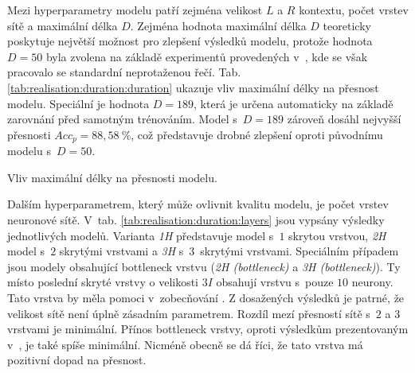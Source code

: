 Mezi hyperparametry modelu patří zejména velikost $L$ a $R$ kontextu, počet vrstev sítě a maximální délka $D$. Zejména hodnota maximální délka $D$ teoreticky poskytuje největší možnost pro zlepšení výsledků modelu, protože hodnota $D=50$ byla zvolena na základě experimentů provedených v~\cite{Hadian2017}, kde se však pracovalo se standardní neprotaženou řečí. Tab. \ref{tab:realisation:duration:duration} ukazuje vliv maximální délky na přesnost modelu. Speciální je hodnota $D=189$, která je určena automaticky na základě zarovnání před samotným trénováním. Model s~$D=189$ zároveň dosáhl nejvyšší přesnosti $Acc_{p} = 88,58\ \%$, což představuje drobné zlepšení oproti původnímu modelu s~$D = 50$.

\begin{table}[htpb]
  \centering
  \def\arraystretch{1.5}
  \caption{Vliv maximální délky na přesnosti modelu.}
  \label{tab:realisation:duration:duration}
\end{table}

Dalším hyperparametrem, který může ovlivnit kvalitu modelu, je počet vrstev neuronové sítě. V~tab. \ref{tab:realisation:duration:layers} jsou vypsány výsledky jednotlivých modelů. Varianta \textit{1H} představuje model s~$1$ skrytou vrstvou, \textit{2H} model s~$2$ skrytými vrstvami a \textit{3H} s~$3$~skrytými vrstvami. Speciálním případem jsou modely obsahující bottleneck vrstvu (\textit{2H (bottleneck)} a \textit{3H (bottleneck)}). Ty místo poslední skryté vrstvy o velikosti $3I$ obsahují vrstvu s~pouze $10$ neurony. Tato vrstva by měla pomoci v~zobecňování \cite{Hadian2017}. Z dosažených výsledků je patrné, že velikost sítě není úplně zásadním parametrem. Rozdíl mezí přesností sítě s~$2$ a $3$ vrstvami je minimální. Přínos bottleneck vrstvy, oproti výsledkům prezentovaným v~\cite{Hadian2017}, je také spíše minimální. Nicméně obecně se dá říci, že tato vrstva má pozitivní dopad na přesnost.

